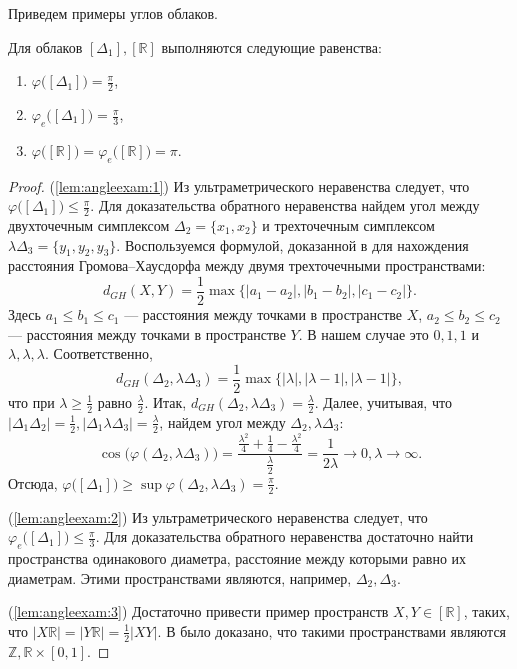Приведем примеры углов облаков.
\begin{lemma}
  Для облаков \( [\Delta _{1}], [\mathbb{R}] \) выполняются следующие
  равенства: \label{lem:angleexam}
  \begin{enumerate}
    \item \( \varphi \big([\Delta _{1}]\big) = \frac{\pi }{2}
      \),\label{lem:angleexam:1}
    \item \( \varphi_e \big([\Delta _{1}]\big) = \frac{\pi }{3}
      \),\label{lem:angleexam:2}
    \item \( \varphi \big([\mathbb{R}]\big) = \varphi_e
      \big([\mathbb{R}]\big) = \pi  \).\label{lem:angleexam:3}
  \end{enumerate}
\end{lemma}
\begin{proof}
    (\ref{lem:angleexam:1}) Из ультраметрического неравенства следует, что \(
  \varphi \big([\Delta _1]\big)\le \frac{\pi }{2} \). Для доказательства
  обратного неравенства найдем угол между двухточечным симплексом \( \Delta
  _{2} = \{x_1, x_2\} \) и трехточечным симплексом \(
  \lambda \Delta _3  = \{y_1,y_2, y_3\}\). Воспользуемся формулой, доказанной в
  \cite{ivanov2016} для нахождения расстояния Громова--Хаусдорфа
  между двумя трехточечными пространствами:
  \[
    d_{GH}(X,Y) = \frac{1}{2} \max\big\{ |a_1 - a_2|,|b_1 - b_2|,|c_1
    - c_2|\big\}.
  \]
  Здесь \( a_1 \le b_1 \le c_1 \) --- расстояния между точками в
  пространстве \( X \), \( a_2 \le b_2 \le c_2 \) --- расстояния между
  точками в пространстве \( Y \). В нашем случае это \( 0,1,1 \) и \(
  \lambda , \lambda , \lambda . \) Соответственно,
  \[
    d_{GH}(\Delta_2, \lambda \Delta _{3}) =\frac{1}{2}
    \max\big\{|\lambda |, | \lambda  -1|, |\lambda -1|\big\},
  \]
  что
  при \( \lambda \ge \frac 1 2 \) равно \(\frac \lambda 2 \). Итак, \(d
    _{GH}(\Delta _2, \lambda \Delta _3) =
  \frac{\lambda }{2} \). Далее, учитывая, что \( |\Delta _1
    \Delta _2|=\frac{1}{2}, |\Delta _1 \lambda \Delta
  _3|=\frac{\lambda }{2} \), найдем угол между \( \Delta _2,
  \lambda \Delta _3 \):
  \[ \cos \big(\varphi (\Delta _2 , \lambda \Delta _3)\big)
    =\frac{\frac{\lambda ^2}{4} + \frac{1}{4} - \frac{\lambda
    ^2}{4}}{\frac{\lambda }{2}} = \frac{1}{2 \lambda }
    \rightarrow 0, \lambda \rightarrow \infty.
  \]
  Отсюда, \( \varphi \big([\Delta _1]\big) \ge \sup \varphi (\Delta _2,
  \lambda \Delta _3) = \frac \pi 2. \)

  (\ref{lem:angleexam:2}) Из ультраметрического неравенства следует, что \(
  \varphi_e \big([\Delta _1]\big)\le \frac{\pi }{3} \). Для доказательства
  обратного неравенства достаточно найти пространства одинакового диаметра,
  расстояние между которыми равно их диаметрам. Этими пространствами
  являются, например, \( \Delta _2, \Delta _3 \).

  (\ref{lem:angleexam:3}) Достаточно привести пример пространств \( X,Y\in
  [\mathbb{R}] \), таких, что \( |X \mathbb{R}| = |Y \mathbb{R}| = \frac 1 2
  |XY|. \) В \cite{mikhailovUnreleased} было доказано, что такими
  пространствами являются \( \mathbb{Z}, \mathbb{R}\times
  [0,1] \).

\end{proof}
